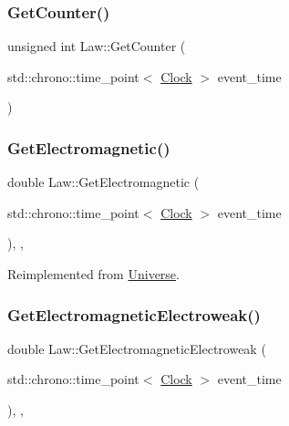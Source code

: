 \subsubsection{\texorpdfstring{Get\+Counter()}{GetCounter()}}
{\footnotesize\ttfamily unsigned int Law\+::\+Get\+Counter (\begin{DoxyParamCaption}\item[{std\+::chrono\+::time\+\_\+point$<$ \mbox{\hyperlink{universe_8h_a0ef8d951d1ca5ab3cfaf7ab4c7a6fd80}{Clock}} $>$}]{event\+\_\+time }\end{DoxyParamCaption})}

\mbox{\label{classLaw_a01eba6e68d2d8a717e2b4789be90853d}} 
\subsubsection{\texorpdfstring{Get\+Electromagnetic()}{GetElectromagnetic()}}
{\footnotesize\ttfamily double Law\+::\+Get\+Electromagnetic (\begin{DoxyParamCaption}\item[{std\+::chrono\+::time\+\_\+point$<$ \mbox{\hyperlink{universe_8h_a0ef8d951d1ca5ab3cfaf7ab4c7a6fd80}{Clock}} $>$}]{event\+\_\+time }\end{DoxyParamCaption})\hspace{0.3cm}{\ttfamily [inline]}, {\ttfamily [final]}, {\ttfamily [virtual]}}



Reimplemented from \mbox{\hyperlink{classUniverse_a63b850ef3f3394313353109d222bf5d1}{Universe}}.

\mbox{\label{classLaw_ae4ccaca7b78905f416f35f9556b1923c}} 
\subsubsection{\texorpdfstring{Get\+Electromagnetic\+Electroweak()}{GetElectromagneticElectroweak()}}
{\footnotesize\ttfamily double Law\+::\+Get\+Electromagnetic\+Electroweak (\begin{DoxyParamCaption}\item[{std\+::chrono\+::time\+\_\+point$<$ \mbox{\hyperlink{universe_8h_a0ef8d951d1ca5ab3cfaf7ab4c7a6fd80}{Clock}} $>$}]{event\+\_\+time }\end{DoxyParamCaption})\hspace{0.3cm}{\ttfamily [inline]}, {\ttfamily [final]}, {\ttfamily [virtual]}}




